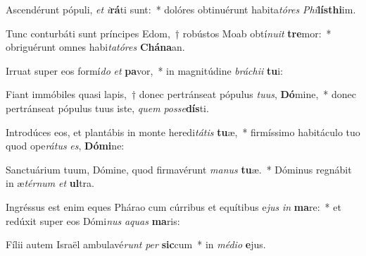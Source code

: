\item Ascendérunt pópuli, \textit{et} \textit{i}\textbf{rá}ti sunt:~* dolóres obtinuérunt habita\textit{tó}\textit{res} \textit{Phi}\textbf{lís}\textbf{thi}im.
\item Tunc conturbáti sunt príncipes Edom,~† robústos Moab obtí\textit{nu}\textit{it} \textbf{tre}mor:~* obriguérunt omnes habi\textit{ta}\textit{tó}\textit{res} \textbf{Chá}\textbf{na}an.
\item Irruat super eos formí\textit{do} \textit{et} \textbf{pa}vor,~* in magnitúdine \textit{brá}\textit{chi}\textit{i} \textbf{tu}i:
\item Fiant immóbiles quasi lapis,~† donec pertránseat pópulus \textit{tu}\textit{us}, \textbf{Dó}mine,~* donec pertránseat pópulus tuus iste, \textit{quem} \textit{pos}\textit{se}\textbf{dís}ti.
\item Introdúces eos, et plantábis in monte heredi\textit{tá}\textit{tis} \textbf{tu}æ,~* firmíssimo habitáculo tuo quod ope\textit{rá}\textit{tus} \textit{es}, \textbf{Dó}\textbf{mi}ne:
\item Sanctuárium tuum, Dómine, quod firmavérunt \textit{ma}\textit{nus} \textbf{tu}æ.~* Dóminus regnábit in æ\textit{tér}\textit{num} \textit{et} \textbf{ul}tra.
\item Ingréssus est enim eques Phárao cum cúrribus et equítibus e\textit{jus} \textit{in} \textbf{ma}re:~* et redúxit super eos Dómi\textit{nus} \textit{a}\textit{quas} \textbf{ma}ris:
\item Fílii autem Israël ambulavé\textit{runt} \textit{per} \textbf{sic}cum~* in \textit{mé}\textit{di}\textit{o} \textbf{e}jus.
